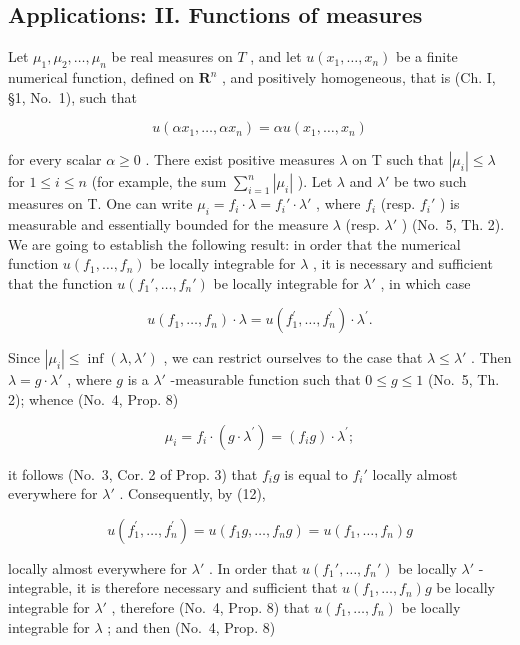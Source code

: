 \subsection{Applications: II. Functions of measures}

Let \(\mu_1, \mu_2, \ldots, \mu_n\) be real measures on \(T\) , and let \(u(x_1, \ldots, x_n)\) be a finite numerical function, defined on \(\mathbf{R}^n\) , and positively homogeneous, that is (Ch. I, §1, No.~1), such that

\[
u (\alpha x _ {1}, \ldots , \alpha x _ {n}) = \alpha u (x _ {1}, \ldots , x _ {n})\tag{12}
\]

for every scalar \(\alpha \geqslant 0\) . There exist positive measures \(\lambda\) on T such that \(|\mu_i| \leqslant \lambda\) for \(1 \leqslant i \leqslant n\) (for example, the sum \(\sum_{i=1}^{n} |\mu_i|\) ). Let \(\lambda\) and \(\lambda'\) be two such measures on T. One can write \(\mu_i = f_i \cdot \lambda = f_i' \cdot \lambda'\) , where \(f_i\) (resp. \(f_i'\) ) is measurable and essentially bounded for the measure \(\lambda\) (resp. \(\lambda'\) ) (No.~5, Th. 2). We are going to establish the following result: in order that the numerical function \(u(f_1, \ldots, f_n)\) be locally integrable for \(\lambda\) , it is necessary and sufficient that the function \(u(f_1', \ldots, f_n')\) be locally integrable for \(\lambda'\) , in which case

\[
u (f _ {1}, \dots , f _ {n}) \cdot \lambda = u (f _ {1} ^ {\prime}, \dots , f _ {n} ^ {\prime}) \cdot \lambda^ {\prime}.
\]

Since \(|\mu_i| \leqslant \inf(\lambda, \lambda')\) , we can restrict ourselves to the case that \(\lambda \leqslant \lambda'\) . Then \(\lambda = g \cdot \lambda'\) , where \(g\) is a \(\lambda'\) -measurable function such that \(0 \leqslant g \leqslant 1\) (No.~5, Th. 2); whence (No.~4, Prop. 8)

\[
\mu_ {i} = f _ {i} \cdot (g \cdot \lambda^ {\prime}) = (f _ {i} g) \cdot \lambda^ {\prime};
\]

it follows (No.~3, Cor. 2 of Prop. 3) that \(f_{i}g\) is equal to \(f_{i}'\) locally almost everywhere for \(\lambda'\) . Consequently, by (12),

\[
u (f _ {1} ^ {\prime}, \dots , f _ {n} ^ {\prime}) = u (f _ {1} g, \dots , f _ {n} g) = u (f _ {1}, \dots , f _ {n}) g
\]

locally almost everywhere for \(\lambda'\) . In order that \(u(f_1', \ldots, f_n')\) be locally \(\lambda'\) -integrable, it is therefore necessary and sufficient that \(u(f_1, \ldots, f_n)g\) be locally integrable for \(\lambda'\) , therefore (No.~4, Prop. 8) that \(u(f_1, \ldots, f_n)\) be locally integrable for \(\lambda\) ; and then (No.~4, Prop. 8)


